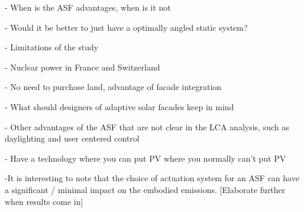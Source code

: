 



- When is the ASF advantages, when is it not

- Would it be better to just have a optimally angled static system?

- Limitations of the study

- Nuclear power in France and Switzerland

- No need to purchase land, advantage of facade integration

- What should designers of adaptive solar facades keep in mind 

- Other advantages of the ASF that are not clear in the LCA analysis, such as daylighting and user centered control 

- Have a technology where you can put PV where you normally can't put PV


-It is interesting to note that the choice of actuation system for an ASF can have a significant / minimal impact on the embodied emissions. [Elaborate further when results come in]